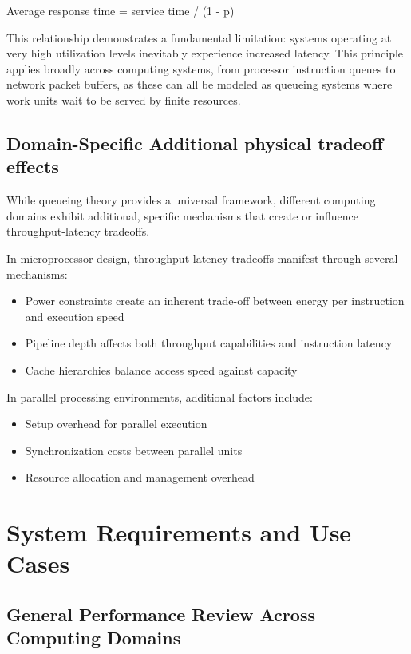 \documentclass[english,12pt,a4paper,pdftex,sci,utf8]{aaltothesis}
\begin{document}
Average response time = service time / (1 - p)

This relationship demonstrates a fundamental limitation: systems operating at very high utilization levels inevitably experience increased latency. This principle applies broadly across computing systems, from processor instruction queues to network packet buffers, as these can all be modeled as queueing systems where work units wait to be served by finite resources.

\subsection{Domain-Specific Additional physical tradeoff effects}

While queueing theory provides a universal framework, different computing domains exhibit additional, specific mechanisms that create or influence throughput-latency tradeoffs.

In microprocessor design, throughput-latency tradeoffs manifest through several mechanisms:
\begin{itemize}
    \item Power constraints create an inherent trade-off between energy per instruction and execution speed
    \item Pipeline depth affects both throughput capabilities and instruction latency
    \item Cache hierarchies balance access speed against capacity
\end{itemize}

In parallel processing environments, additional factors include:
\begin{itemize}
    \item Setup overhead for parallel execution
    \item Synchronization costs between parallel units
    \item Resource allocation and management overhead
\end{itemize}



\clearpage

\section{System Requirements and Use Cases} \label{sec:usecases}
\subsection{General Performance Review Across Computing Domains}
\end{document}
